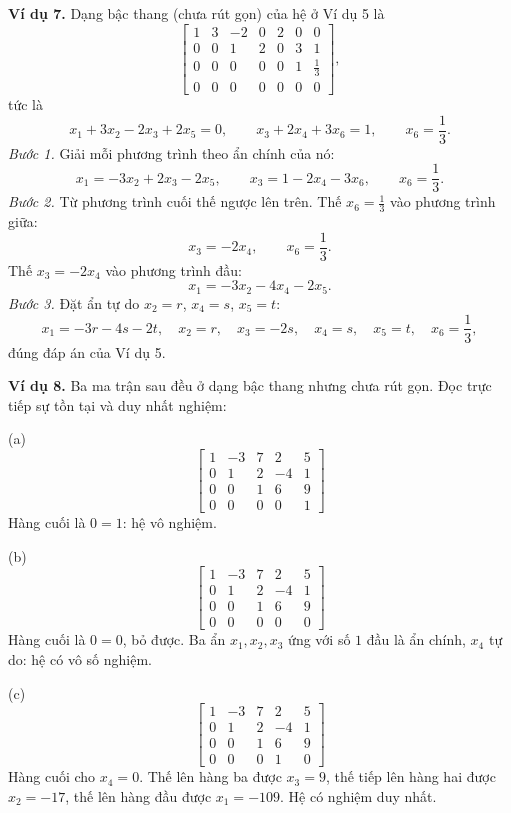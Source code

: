 \documentclass[12pt,a4paper]{article}
\begin{document}
\textbf{Ví dụ 7.} Dạng bậc thang (chưa rút gọn) của hệ ở Ví dụ 5 là
$$
\left[ \begin{array}{cccccc|c} 1 & 3 & -2 & 0 & 2 & 0 & 0 \\ 0 & 0 & 1 & 2 & 0 & 3 & 1 \\ 0 & 0 & 0 & 0 & 0 & 1 & \frac13 \\ 0 & 0 & 0 & 0 & 0 & 0 & 0 \end{array} \right],
$$
tức là
$$
x_1+3x_2-2x_3+2x_5=0,\qquad x_3+2x_4+3x_6=1,\qquad x_6=\frac13.
$$
\emph{Bước 1.} Giải mỗi phương trình theo ẩn chính của nó:
$$
x_1=-3x_2+2x_3-2x_5,\qquad x_3=1-2x_4-3x_6,\qquad x_6=\frac13.
$$
\emph{Bước 2.} Từ phương trình cuối thế ngược lên trên. Thế \(x_6=\frac13\) vào phương trình giữa:
$$
x_3=-2x_4,\qquad x_6=\frac13.
$$
Thế \(x_3=-2x_4\) vào phương trình đầu:
$$
x_1=-3x_2-4x_4-2x_5.
$$
\emph{Bước 3.} Đặt ẩn tự do \(x_2=r\), \(x_4=s\), \(x_5=t\):
$$
x_1=-3r-4s-2t,\quad x_2=r,\quad x_3=-2s,\quad x_4=s,\quad x_5=t,\quad x_6=\frac13,
$$
đúng đáp án của Ví dụ 5.

\textbf{Ví dụ 8.} Ba ma trận sau đều ở dạng bậc thang nhưng chưa rút gọn. Đọc trực tiếp sự tồn tại và duy nhất nghiệm:

(a)
$$
\left[ \begin{array}{cccc|c} 1 & -3 & 7 & 2 & 5 \\ 0 & 1 & 2 & -4 & 1 \\ 0 & 0 & 1 & 6 & 9 \\ 0 & 0 & 0 & 0 & 1 \end{array} \right]
$$
Hàng cuối là \(0=1\): hệ vô nghiệm.

(b)
$$
\left[ \begin{array}{cccc|c} 1 & -3 & 7 & 2 & 5 \\ 0 & 1 & 2 & -4 & 1 \\ 0 & 0 & 1 & 6 & 9 \\ 0 & 0 & 0 & 0 & 0 \end{array} \right]
$$
Hàng cuối là \(0=0\), bỏ được. Ba ẩn \(x_1,x_2,x_3\) ứng với số \(1\) đầu là ẩn chính, \(x_4\) tự do: hệ có vô số nghiệm.

(c)
$$
\left[ \begin{array}{cccc|c} 1 & -3 & 7 & 2 & 5 \\ 0 & 1 & 2 & -4 & 1 \\ 0 & 0 & 1 & 6 & 9 \\ 0 & 0 & 0 & 1 & 0 \end{array} \right]
$$
Hàng cuối cho \(x_4=0\). Thế lên hàng ba được \(x_3=9\), thế tiếp lên hàng hai được \(x_2=-17\), thế lên hàng đầu được \(x_1=-109\). Hệ có nghiệm duy nhất.
\end{document}
